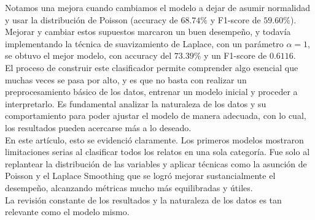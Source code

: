 \documentclass[12pt, letterpaper]{report}
\begin{document}
Notamos una mejora cuando cambiamos el modelo a dejar de asumir normalidad y usar la distribución de Poisson (accuracy de $68.74\%$ y F1-score de $59.60\%$). Mejorar y cambiar estos supuestos marcaron un buen desempeño, y todavía implementando la técnica de suavizamiento de Laplace, con un parámetro $\alpha=1$, se obtuvo el mejor modelo, con accuracy del $73.39\%$ y un F1-score de $0.6116$. 
\\

El proceso de construir este clasificador permite comprender algo esencial que muchas veces se pasa por alto, y es que no basta con realizar un preprocesamiento básico de los datos, entrenar un modelo inicial y proceder a interpretarlo. Es fundamental analizar la naturaleza de los datos y su comportamiento para poder ajustar el modelo de manera adecuada, con lo cual, los resultados pueden acercarse más a lo deseado.
\\

En este artículo, esto se evidenció claramente. Los primeros modelos mostraron limitaciones serias al clasificar todos los relatos en una sola categoría. Fue solo al replantear la distribución de las variables y aplicar técnicas como la asunción de Poisson y el Laplace Smoothing que se logró mejorar sustancialmente el desempeño, alcanzando métricas mucho más equilibradas y útiles.
\\

La revisión constante de los resultados y la naturaleza de los datos es tan relevante como el modelo mismo.
\printbibliography[title={Referencias}]
\end{document}
